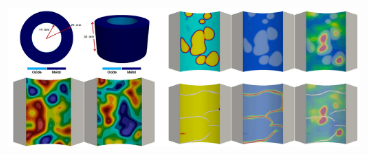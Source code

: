\begin{frame}
\begin{columns}
\begin{column}{0.5\textwidth}
\begin{figure}
        \includegraphics[width=0.83\textwidth]{introduction/figures/spallation}
      \end{figure}
    \end{column}
  \end{columns}
\end{frame}
